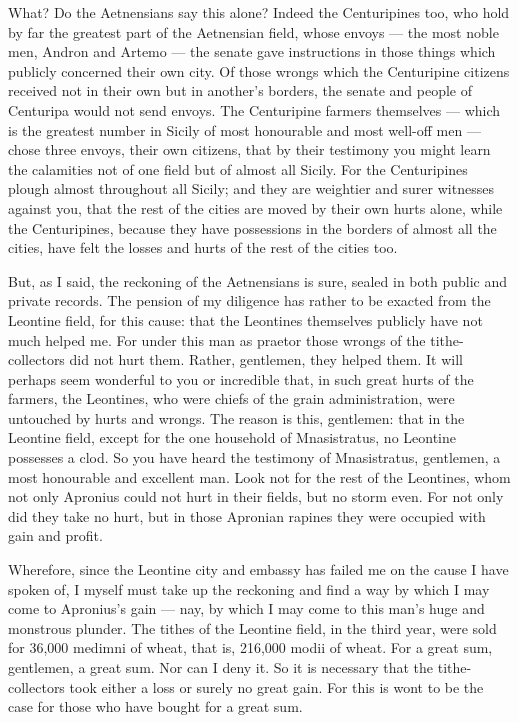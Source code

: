  What? Do the Aetnensians say this alone? Indeed the Centuripines too, who hold by far the greatest part of the Aetnensian field, whose envoys --- the most noble men, Andron and Artemo --- the senate gave instructions in those things which publicly concerned their own city. Of those wrongs which the Centuripine citizens received not in their own but in another's borders, the senate and people of Centuripa would not send envoys. The Centuripine farmers themselves --- which is the greatest number in Sicily of most honourable and most well-off men --- chose three envoys, their own citizens, that by their testimony you might learn the calamities not of one field but of almost all Sicily. For the Centuripines plough almost throughout all Sicily; and they are weightier and surer witnesses against you, that the rest of the cities are moved by their own hurts alone, while the Centuripines, because they have possessions in the borders of almost all the cities, have felt the losses and hurts of the rest of the cities too.

 But, as I said, the reckoning of the Aetnensians is sure, sealed in both public and private records. The pension of my diligence has rather to be exacted from the Leontine field, for this cause: that the Leontines themselves publicly have not much helped me. For under this man as praetor those wrongs of the tithe-collectors did not hurt them. Rather, gentlemen, they helped them. It will perhaps seem wonderful to you or incredible that, in such great hurts of the farmers, the Leontines, who were chiefs of the grain administration, were untouched by hurts and wrongs. The reason is this, gentlemen: that in the Leontine field, except for the one household of Mnasistratus, no Leontine possesses a clod. So you have heard the testimony of Mnasistratus, gentlemen, a most honourable and excellent man. Look not for the rest of the Leontines, whom not only Apronius could not hurt in their fields, but no storm even. For not only did they take no hurt, but in those Apronian rapines they were occupied with gain and profit.

 Wherefore, since the Leontine city and embassy has failed me on the cause I have spoken of, I myself must take up the reckoning and find a way by which I may come to Apronius's gain --- nay, by which I may come to this man's huge and monstrous plunder. The tithes of the Leontine field, in the third year, were sold for 36,000 medimni of wheat, that is, 216,000 modii of wheat. For a great sum, gentlemen, a great sum. Nor can I deny it. So it is necessary that the tithe-collectors took either a loss or surely no great gain. For this is wont to be the case for those who have bought for a great sum.

